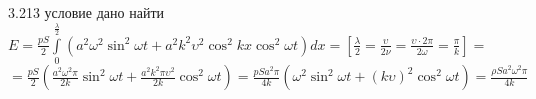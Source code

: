 \testCom
{%
	3.213
}
{%
	условие
}
{%
	дано
}
{%
	найти
}
{%
	$E = \frac{pS}{2} \int\limits_0^{\frac{\lambda}{2}} (a^2 \omega^2 \sin^2 \omega t + a^2 k^2 \upsilon^2 \cos^2 k x \cos^2 \omega t) dx = \left[ \frac{\lambda}{2} = \frac{\upsilon}{2 \nu} = \frac{\upsilon \cdot 2 \pi}{2 \omega} = \frac{\pi}{k}\right] = $\\
	$= \frac{pS}{2} \left(\frac{a^2 \omega^2 \pi}{2k} \sin^2 \omega t + \frac{a^2 k^2 \pi \upsilon^2}{2 k} \cos^2 \omega t \right) = \frac{pS a^2 \pi}{4 k} \left(\omega^2 \sin^2 \omega t + (k \upsilon)^2 \cos^2 \omega t \right) = \frac{\rho S a^2 \omega^2 \pi}{4 k}$\\
}

